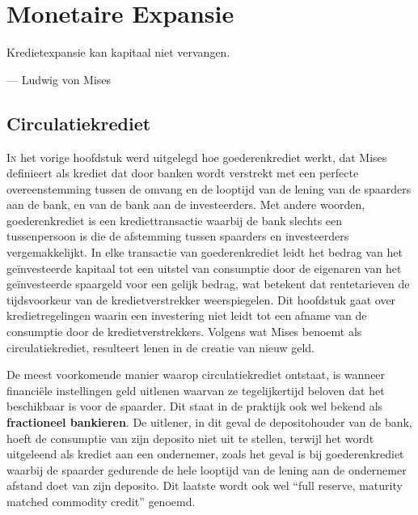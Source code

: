 \hypertarget{monetaire-expansie}{%
\chapter{Monetaire Expansie}\label{monetaire-expansie}}

\begin{blockquotebox}
    Kredietexpansie kan kapitaal niet vervangen.\footnotemark
    \par\raggedleft--- Ludwig von Mises
\end{blockquotebox}
\autocite{166}

\vspace{-1em}
\hypertarget{circulatiekrediet}{%
\section{Circulatiekrediet}\label{circulatiekrediet}}

\lettrine{I}n het vorige hoofdstuk werd uitgelegd hoe goederenkrediet werkt, dat Mises definieert als krediet dat door banken wordt verstrekt met een perfecte overeenstemming tussen de omvang en de looptijd van de lening van de spaarders aan de bank, en van de bank aan de investeerders. Met andere woorden, goederenkrediet is een krediettransactie waarbij de bank slechts een tussenpersoon is die de afstemming tussen spaarders en investeerders vergemakkelijkt. In elke transactie van goederenkrediet leidt het bedrag van het geïnvesteerde kapitaal tot een uitstel van consumptie door de eigenaren van het geïnvesteerde spaargeld voor een gelijk bedrag, wat betekent dat rentetarieven de tijdsvoorkeur van de kredietverstrekker weerspiegelen. Dit hoofdstuk gaat over kredietregelingen waarin een investering niet leidt tot een afname van de consumptie door de kredietverstrekkers. Volgens wat Mises benoemt als circulatiekrediet, resulteert lenen in de creatie van nieuw geld.

De meest voorkomende manier waarop circulatiekrediet ontstaat, is wanneer financiële instellingen geld uitlenen waarvan ze tegelijkertijd beloven dat het beschikbaar is voor de spaarder. Dit staat in de praktijk ook wel bekend als \textbf{fractioneel bankieren}. De uitlener, in dit geval de depositohouder van de bank, hoeft de consumptie van zijn deposito niet uit te stellen, terwijl het wordt uitgeleend als krediet aan een ondernemer, zoals het geval is bij goederenkrediet waarbij de spaarder gedurende de hele looptijd van de lening aan de ondernemer afstand doet van zijn deposito. Dit laatste wordt ook wel ``full reserve, maturity matched commodity credit'' genoemd.

